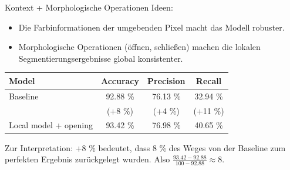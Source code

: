 \begin{frame}{Kontext + Morphologische Operationen}
    Ideen:

    \begin{itemize}
        \item Die Farbinformationen der umgebenden Pixel macht das Modell
              robuster.
        \item Morphologische Operationen (öffnen, schließen) machen die lokalen
              Segmentierungsergebnisse global konsistenter.
    \end{itemize}


    \begin{table}
    \begin{tabular}{lccc}
    \toprule
    \textbf{Model}        & \textbf{Accuracy} & \textbf{Precision} & \textbf{Recall}   \\ \midrule
    Baseline              & 92.88 \%          & 76.13 \%         & 32.94 \% \\
                          & {\tiny (+8 \%)}   & {\tiny (+4 \%)}  & {\tiny (+11 \%)}\\
    Local model + opening & 93.42 \%          & 76.98 \%         & 40.65 \% \\
    \end{tabular}
    \end{table}

    Zur Interpretation: +8 \% bedeutet, dass 8 \% des Weges von der Baseline
    zum perfekten Ergebnis zurückgelegt wurden. Also
    $\frac{93.42 - 92.88}{100 - 92.88} \approx 8$.
\end{frame}

